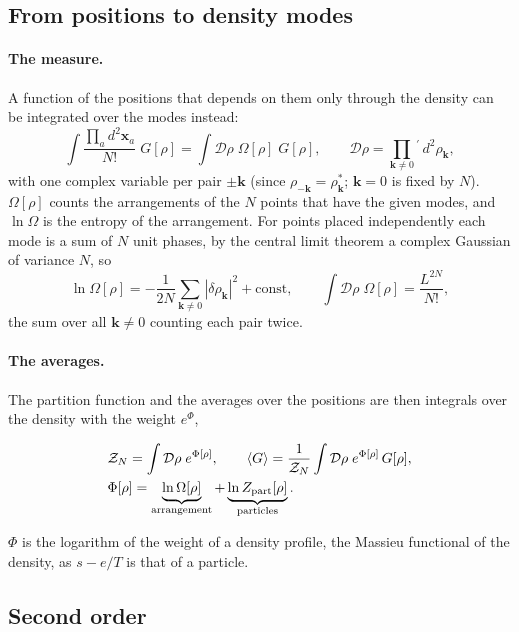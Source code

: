 \documentclass[11pt,aps,preprint,nofootinbib,superscriptaddress,tightenlines]{revtex4-2}
\newcommand{\avg}[1]{\langle #1\rangle}
\def\st{\begin{equation}}
\def\stp{\end{equation}}
\let\oldparagraph\paragraph
\renewcommand{\paragraph}{\par\bigskip\oldparagraph}
\begin{document}
\subsection{From positions to density modes}
\label{sec:Phi}

\paragraph{The measure.}  A function of the positions that depends on them only through the density can be integrated over the modes instead:
\st
\int\frac{\prod_ad^2\bm x_a}{N!}\;G[\rho]=\int\mathcal D\rho\;\Omega[\rho]\;G[\rho],\qquad \mathcal D\rho=\prod_{\bm k\neq0}{}^{'}\,d^2\rho_{\bm k} ,
\stp
with one complex variable per pair $\pm\bm k$ (since $\rho_{-\bm k}=\rho_{\bm k}^*$; $\bm k=0$ is fixed by $N$).  $\Omega[\rho]$ counts the arrangements of the $N$ points
that have the given modes, and $\ln\Omega$ is the entropy of the arrangement.  For points placed independently each mode is a sum of $N$ unit phases, by the
central limit theorem a complex Gaussian of variance $N$, so
\st
\ln\Omega[\rho]=-\frac1{2N}\sum_{\bm k\neq0}|\delta\rho_{\bm k}|^2+\text{const},\qquad \int\mathcal D\rho\;\Omega[\rho]=\frac{L^{2N}}{N!} ,
\stp
the sum over all $\bm k\neq0$ counting each pair twice.

\paragraph{The averages.}  The partition function and the averages over the positions are then integrals over the density with the weight $e^{\Phi}$,
\begin{keyeq}
\st
\begin{aligned}
&\mathcal Z_N=\int\mathcal D\rho\;e^{\Phi[\rho]},\qquad \avg{G}=\frac1{\mathcal Z_N}\int\mathcal D\rho\;e^{\Phi[\rho]}\,G[\rho],\\
&\Phi[\rho]=\underbrace{\ln\Omega[\rho]}_{\text{arrangement}}+\underbrace{\ln Z_{\rm part}[\rho]}_{\text{particles}} .
\end{aligned}
\label{Phi}
\stp
\end{keyeq}
$\Phi$ is the logarithm of the weight of a density profile, the Massieu functional of the density, as $s-e/T$ is that of a particle.

\subsection{Second order}
\label{sec:second}
\end{document}
